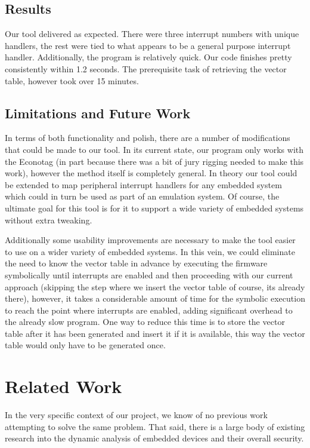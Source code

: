 \documentclass[letterpaper, 10 pt, conference]{ieeeconf}
\begin{document}
\subsection{Results} \label{rslt} %
Our tool delivered as expected. There were three interrupt numbers with unique handlers, the rest were tied to what appears to be a general purpose interrupt handler. Additionally, the program is relatively quick. Our code finishes pretty consistently within 1.2 seconds. The prerequisite task of retrieving the vector table, however took over 15 minutes. 

\subsection{Limitations and Future Work} \label{lmts}
In terms of both functionality and polish, there are a number of modifications that could be made to our tool. In its current state, our program only works with the Econotag (in part because there was a bit of jury rigging needed to make this work), however the method itself is completely general. In theory our tool could be extended to map peripheral interrupt handlers for any embedded system which could in turn be used as part of an emulation system. Of course, the ultimate goal for this tool is for it to support a wide variety of embedded systems without extra tweaking. 

Additionally some usability improvements are necessary to make the tool easier to use on a wider variety of embedded systems. In this vein, we could eliminate the need to know the vector table in advance by executing the firmware symbolically until interrupts are enabled and then proceeding with our current approach (skipping the step where we insert the vector table of course, its already there), however, it takes a considerable amount of time for the symbolic execution to reach the point where interrupts are enabled, adding significant overhead to the already slow program. One way to reduce this time is to store the vector table after it has been generated and insert it if it is available, this way the vector table would only have to be generated once.

\section{Related Work} \label{rltd} %
In the very specific context of our project, we know of no previous work attempting to solve the same problem. That said, there is a large body of existing research into the dynamic analysis of embedded devices and their overall security.
\end{document}
